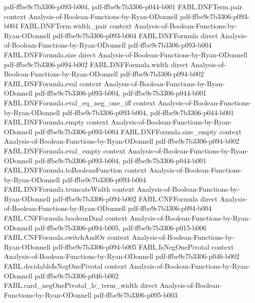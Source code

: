\begin{theorem}
  {pdf-ffbe9c7b3306-p093-b004,
    pdf-ffbe9c7b3306-p044-b001}
\proofstep
  {FABL.DNFTerm.pair}
  {context}
  {Analysis-of-Boolean-Functions-by-Ryan-ODonnell}
  {pdf-ffbe9c7b3306-p093-b004}
\proofstep
  {FABL.DNFTerm.width_pair}
  {context}
  {Analysis-of-Boolean-Functions-by-Ryan-ODonnell}
  {pdf-ffbe9c7b3306-p093-b004}
\proofstep
  {FABL.DNFFormula}
  {direct}
  {Analysis-of-Boolean-Functions-by-Ryan-ODonnell}
  {pdf-ffbe9c7b3306-p093-b004}
\proofstep
  {FABL.DNFFormula.size}
  {direct}
  {Analysis-of-Boolean-Functions-by-Ryan-ODonnell}
  {pdf-ffbe9c7b3306-p094-b002}
\proofstep
  {FABL.DNFFormula.width}
  {direct}
  {Analysis-of-Boolean-Functions-by-Ryan-ODonnell}
  {pdf-ffbe9c7b3306-p094-b002}
\proofstep
  {FABL.DNFFormula.eval}
  {context}
  {Analysis-of-Boolean-Functions-by-Ryan-ODonnell}
  {pdf-ffbe9c7b3306-p093-b004,
    pdf-ffbe9c7b3306-p044-b001}
\proofstep
  {FABL.DNFFormula.eval_eq_neg_one_iff}
  {context}
  {Analysis-of-Boolean-Functions-by-Ryan-ODonnell}
  {pdf-ffbe9c7b3306-p093-b004,
    pdf-ffbe9c7b3306-p044-b001}
\proofstep
  {FABL.DNFFormula.empty}
  {context}
  {Analysis-of-Boolean-Functions-by-Ryan-ODonnell}
  {pdf-ffbe9c7b3306-p093-b004}
\proofstep
  {FABL.DNFFormula.size_empty}
  {context}
  {Analysis-of-Boolean-Functions-by-Ryan-ODonnell}
  {pdf-ffbe9c7b3306-p094-b002}
\proofstep
  {FABL.DNFFormula.eval_empty}
  {context}
  {Analysis-of-Boolean-Functions-by-Ryan-ODonnell}
  {pdf-ffbe9c7b3306-p093-b004,
    pdf-ffbe9c7b3306-p044-b001}
\proofstep
  {FABL.DNFFormula.toBooleanFunction}
  {context}
  {Analysis-of-Boolean-Functions-by-Ryan-ODonnell}
  {pdf-ffbe9c7b3306-p093-b004}
\proofstep
  {FABL.DNFFormula.truncateWidth}
  {context}
  {Analysis-of-Boolean-Functions-by-Ryan-ODonnell}
  {pdf-ffbe9c7b3306-p094-b002}
\proofstep
  {FABL.CNFFormula}
  {direct}
  {Analysis-of-Boolean-Functions-by-Ryan-ODonnell}
  {pdf-ffbe9c7b3306-p094-b004}
\proofstep
  {FABL.CNFFormula.booleanDual}
  {context}
  {Analysis-of-Boolean-Functions-by-Ryan-ODonnell}
  {pdf-ffbe9c7b3306-p094-b005,
    pdf-ffbe9c7b3306-p015-b006}
\proofstep
  {FABL.CNFFormula.switchAndOr}
  {context}
  {Analysis-of-Boolean-Functions-by-Ryan-ODonnell}
  {pdf-ffbe9c7b3306-p094-b005}
\proofstep
  {FABL.IsNegOnePivotal}
  {context}
  {Analysis-of-Boolean-Functions-by-Ryan-ODonnell}
  {pdf-ffbe9c7b3306-p046-b002}
\proofstep
  {FABL.decidableIsNegOnePivotal}
  {context}
  {Analysis-of-Boolean-Functions-by-Ryan-ODonnell}
  {pdf-ffbe9c7b3306-p046-b002}
\proofstep
  {FABL.card_negOnePivotal_le_term_width}
  {direct}
  {Analysis-of-Boolean-Functions-by-Ryan-ODonnell}
  {pdf-ffbe9c7b3306-p095-b003}

\end{theorem}
